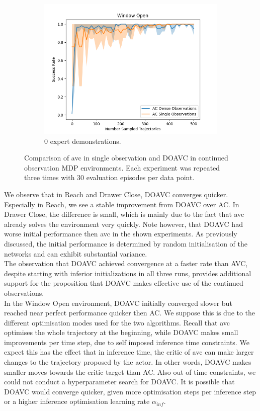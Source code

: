 \begin{figure}[htbp]
\begin{subfigure}[t]{0.32\textwidth}
    \includegraphics[width=\textwidth]{images/dense_vs_sparse_0/Window Open.png}
    \caption{0 expert demonstrations.}
  \end{subfigure}
  \caption{Comparison of \ac{avc} in single observation and DOAVC in continued observation MDP environments. Each experiment was repeated three times with 30 evaluation episodes per data point.
  }
  \label{fig:dense_vs_single}
\end{figure}

We observe that in Reach and Drawer Close, DOAVC converges quicker. Especially in Reach, we see a stable improvement from DOAVC over AC. In Drawer Close, the difference is 
small, which is mainly due to the fact that \ac{avc} already solves the environment very quickly. Note however, that DOAVC had worse initial performance then \ac{avc} in the shown experiments. 
As previously discussed, the initial performance is determined by random initialisation of the networks and can exhibit substantial 
variance.\\ 

The observation that DOAVC achieved convergence at a faster rate than AVC, despite starting with inferior initializations in 
all three runs, provides additional support for the proposition that DOAVC makes effective use of the continued observations. \\

In the Window Open environment, DOAVC initially converged slower but 
reached near perfect performance quicker then AC. We suppose this is due to the different optimisation modes used for the two algorithms. Recall that \ac{avc} optimises the whole 
trajectory at the beginning, while DOAVC makes small improvements per time step, due to self imposed inference time constraints. We expect this has the effect that in inference time, the critic of 
\ac{avc} can make larger changes to the trajectory proposed by the actor. In other words, DOAVC makes smaller moves towards the critic target than AC. Also out of time constraints, we could 
not conduct a hyperparameter search for DOAVC. It is possible that DOAVC would converge quicker, given more optimisation steps per inference step or a higher inference optimisation 
learning rate $\alpha_{inf}$.\\ 

